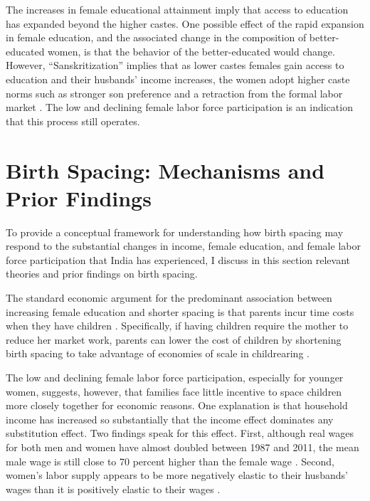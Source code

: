 \documentclass[12pt,letterpaper]{article}
\begin{document}
The increases in female educational attainment imply that access to education has 
expanded beyond the higher castes. 
One possible effect of the rapid expansion in female education, and the 
associated change in the composition of better-educated women, is that the behavior
of the better-educated would change. 
However, ``Sanskritization'' implies that as lower castes females gain access to 
education and their husbands' income increases, the women adopt higher caste 
norms such as stronger son preference and a retraction from the formal labor 
market \citep{Srinivas1956,Chen1995,Abraham2013,Chatterjee2018}.
The low and declining female labor force participation is an indication that this
process still operates.


\section{Birth Spacing: Mechanisms and Prior Findings}

To provide a conceptual framework for understanding how birth spacing
may respond to the substantial changes in income, female education, and
female labor force participation that India has experienced, I discuss
in this section relevant theories and prior findings on birth spacing.

The standard economic argument for the predominant association between
increasing female education and shorter spacing is that parents incur
time costs when they have children \citep{Hotz1997,schultz97}.
Specifically, if having children require the mother to reduce her market work, parents 
can lower the cost of children by shortening birth spacing to 
take advantage of economies of scale in childrearing \citep{Vijverberg1982}.

The low and declining female labor force participation, especially for younger women, 
suggests, however, that families face little incentive to space children more closely 
together for economic reasons.
One explanation is that household income has increased so substantially that the income 
effect dominates any substitution effect.
Two findings speak for this effect.
First, although real wages for both men and women have almost doubled between 1987 and 
2011, the mean male wage is still close to 70 percent higher than the female wage 
\citep{Klasen2015,Bhargava2018}.
Second, women’s labor supply appears to be more negatively elastic to their husbands' 
wages than it is positively elastic to their wages \citep{Bhargava2018}.
\end{document}
